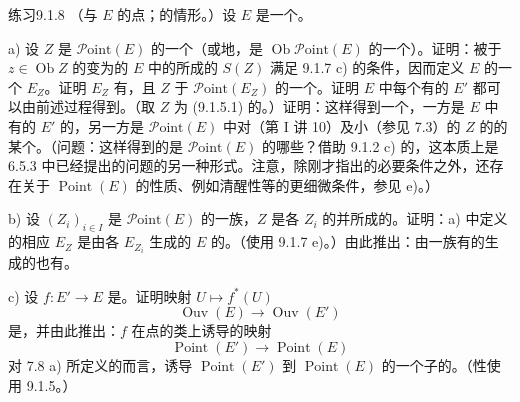 \begin{SGAresult}{练习}{9.1.8}
（与 $E$ 的点；的情形。）设 $E$ 是一个。

a) 设 $Z$ 是 $\mathscr{P}\mathrm{oint}(E)$ 的一个（或地，是 $\operatorname{Ob}\mathscr{P}\mathrm{oint}(E)$ 的一个）。证明：被于 $z\in\operatorname{Ob}Z$ 的变为的 $E$ 中的所成的 $S(Z)$ 满足 9.1.7 c) 的条件，因而定义 $E$ 的一个 $E_Z$。证明 $E_Z$ 有，且 $Z$ 于 $\mathscr{P}\mathrm{oint}(E_Z)$ 的一个。证明 $E$ 中每个有的 $E'$ 都可以由前述过程得到。（取 $Z$ 为 (9.1.5.1) 的。）证明：这样得到一个，一方是 $E$ 中有的 $E'$ 的，另一方是 $\mathscr{P}\mathrm{oint}(E)$ 中对（第 I 讲 10）及小（参见 7.3）的 $Z$ 的的某个。（问题：这样得到的是 $\mathscr{P}\mathrm{oint}(E)$ 的哪些？借助 9.1.2 c) 的，这本质上是 6.5.3 中已经提出的问题的另一种形式。注意，除刚才指出的必要条件之外，还存在关于 $\operatorname{Point}(E)$ 的性质、例如清醒性等的更细微条件，参见 e)。）

b) 设 $(Z_i)_{i\in I}$ 是 $\mathscr{P}\mathrm{oint}(E)$ 的一族，$Z$ 是各 $Z_i$ 的并所成的。证明：a) 中定义的相应 $E_Z$ 是由各 $E_{Z_i}$ 生成的 $E$ 的。（使用 9.1.7 e)。）由此推出：由一族有的生成的也有。

c) 设 $f:E'\to E$ 是。证明映射 $U\mapsto f^*(U)$
\[
\operatorname{Ouv}(E)\longrightarrow\operatorname{Ouv}(E')\tag{9.1.8.1}
\]
是，并由此推出：$f$ 在点的类上诱导的映射
\[
\operatorname{Point}(E')\longrightarrow\operatorname{Point}(E)\tag{9.1.8.2}
\]
对 7.8 a) 所定义的而言，诱导 $\operatorname{Point}(E')$ 到 $\operatorname{Point}(E)$ 的一个子的。（性使用 9.1.5。）


\end{SGAresult}
